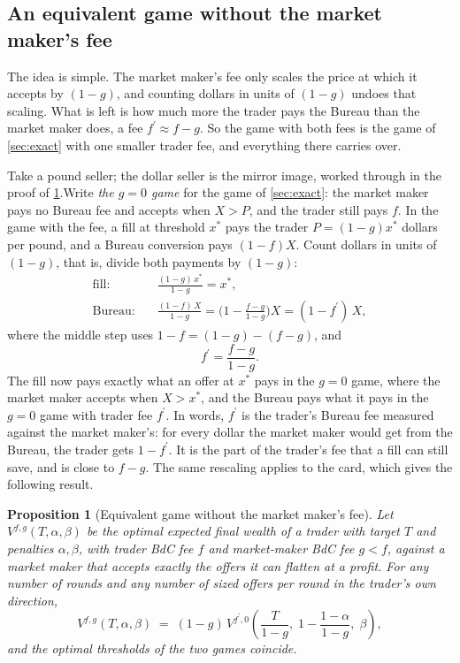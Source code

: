\documentclass[11pt,a4paper]{article}
\theoremstyle{plain}
\newtheorem{proposition}{Proposition}[section]
\theoremstyle{definition}
\newcommand{\1}{\mathbf{1}}
\newcommand{\fp}{f^{\prime}}
\begin{document}
\subsection{An equivalent game without the market maker's fee}\label{sec:card}
The idea is simple. The market maker's fee only scales the price at which it accepts by $(1-g)$, and counting dollars in units of $(1-g)$ undoes that scaling. What is left is how much more the trader pays the Bureau than the market maker does, a fee $\fp\approx f-g$. So the game with both fees is the game of \cref{sec:exact} with one smaller trader fee, and everything there carries over.
\medskip

Take a pound seller; the dollar seller is the mirror image, worked through in the proof of \cref{prop:card}.Write \emph{the $g=0$ game} for the game of \cref{sec:exact}: the market maker pays no Bureau fee and accepts when $X>P$, and the trader still pays $f$. In the game with the fee, a fill at threshold $x^*$ pays the trader $P=(1-g)x^*$ dollars per pound, and a Bureau conversion pays $(1-f)X$. Count dollars in units of $(1-g)$, that is, divide both payments by $(1-g)$:
\begin{align*}
  \text{fill:}\quad & \frac{(1-g)\,x^*}{1-g} = x^*,\\
  \text{Bureau:}\quad & \frac{(1-f)\,X}{1-g} = \Big(1-\frac{f-g}{1-g}\Big)X = (1-\fp)\,X,
\end{align*}
where the middle step uses $1-f=(1-g)-(f-g)$, and
\begin{equation}\label{eq:fprime}
  \fp = \frac{f-g}{1-g}.
\end{equation}
The fill now pays exactly what an offer at $x^*$ pays in the $g=0$ game, where the market maker accepts when $X>x^*$, and the Bureau pays what it pays in the $g=0$ game with trader fee $\fp$.
In words, $\fp$ is the trader's Bureau fee measured against the market maker's: for every dollar the market maker would get from the Bureau, the trader gets $1-\fp$. It is the part of the trader's fee that a fill can still save, and is close to $f-g$. The same rescaling applies to the card, which gives the following result.

\begin{proposition}[Equivalent game without the market maker's fee]\label{prop:card}
Let $V^{f,g}(T,\alpha,\beta)$ be the optimal expected final wealth of a trader with target $T$ and penalties $\alpha,\beta$, with trader BdC fee $f$ and market-maker BdC fee $g<f$, against a market maker that accepts exactly the offers it can flatten at a profit. For any number of rounds and any number of sized offers per round in the trader's own direction,
\begin{equation}\label{eq:card}
  V^{f,g}(T,\alpha,\beta) \;=\; (1-g)\,V^{\fp,0}\!\left(\frac{T}{1-g},\; 1-\frac{1-\alpha}{1-g},\; \beta\right),
\end{equation}
and the optimal thresholds of the two games coincide.
\end{proposition}
\end{document}
